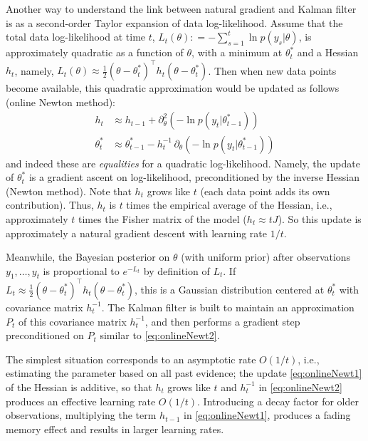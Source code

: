 \documentclass[11pt,a4paper]{article}
\newcommand{\deq}{\mathrel{\mathop{:}}=}
\newcommand{\1}{\mathbbm{1}}
\theoremstyle{yannthm}
\theoremstyle{yannthm2}
\newcommand{\transp}[1]{#1^{\!\top}\!}
\numberwithin{equation}{section}
\begin{document}
Another way to understand the link between natural gradient and Kalman
filter is as a second-order Taylor expansion of data log-likelihood.
Assume that the total data log-likelihood at time $t$, $L_t(\theta)\deq-
\sum_{s=1}^t \ln p(y_s|\theta)$, is approximately quadratic as a function
of $\theta$, with a minimum at $\theta^\ast_t$ and a Hessian $h_t$,
namely, $L_t(\theta)\approx \frac12
\transp{(\theta-\theta^\ast_t)}h_t(\theta-\theta^\ast_t)$. Then when new
data points become available, this quadratic approximation would be updated
as follows (online Newton method):
\begin{align}
\label{eq:onlineNewt1}
h_t&\approx h_{t-1} + \partial_\theta^2 (-\ln
p(y_t|\theta^\ast_{t-1}))
\\
\label{eq:onlineNewt2}
\theta^\ast_t &\approx \theta^\ast_{t-1} - h_t^{-1} \,\partial_\theta (-\ln
p(y_t|\theta^\ast_{t-1}))
\end{align}
and indeed these
are \emph{equalities} for a quadratic log-likelihood. Namely, the update
of $\theta^\ast_t$ is a gradient ascent on log-likelihood,
preconditioned by the inverse Hessian (Newton method). Note that $h_t$
grows like $t$ (each data point adds its own contribution). Thus,
$h_t$ is $t$ times the empirical average of the Hessian, i.e., approximately
$t$ times the Fisher matrix of the model ($h_t\approx t J$). So this update is approximately
a natural gradient descent with learning rate $1/t$.

Meanwhile, the Bayesian posterior on $\theta$ (with uniform prior) after
observations $y_1,\ldots,y_t$ is proportional to $e^{-L_t}$ by definition
of $L_t$. If $L_t\approx \frac12
\transp{(\theta-\theta^\ast_t)}h_t(\theta-\theta^\ast_t)$, this is a Gaussian distribution centered
at $\theta^\ast_t$ with covariance matrix $h_t^{-1}$. The Kalman filter
is built to
maintain an approximation $P_t$ of this covariance matrix $h_t^{-1}$, and
then performs a gradient step preconditioned on $P_t$ similar to
\eqref{eq:onlineNewt2}.

The simplest situation corresponds to an asymptotic rate $O(1/t)$, i.e.,
estimating the parameter based on all past evidence; the update
\eqref{eq:onlineNewt1} of the Hessian is additive, so that $h_t$ grows
like $t$ and $h_t^{-1}$
in \eqref{eq:onlineNewt2}
produces an effective learning rate $O(1/t)$.
Introducing a decay factor for older observations, multiplying the term
$h_{t-1}$ in \eqref{eq:onlineNewt1}, produces a fading memory effect and
results in larger learning rates.

\bigskip
\end{document}
